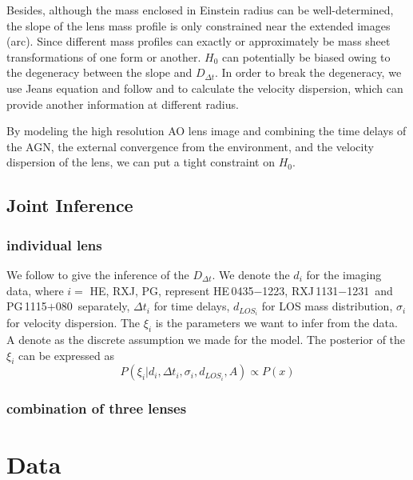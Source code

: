 \documentclass[fleqn,usenatbib]{mnras}
\newcommand\rxj{RXJ\,1131$-$1231}
\newcommand\he{HE\,0435$-$1223}
\newcommand\pg{PG\,1115$+$080}
\def\dt{D_{\Delta t}}
\begin{document}
Besides, although the mass enclosed in Einstein radius can be well-determined, the slope of the lens mass profile is only constrained near the extended images (arc). Since different mass profiles can exactly or approximately be mass sheet transformations of one form or another. $H_{0}$ can potentially be biased owing to the degeneracy between the slope and $D_{\Delta t}$. In order to break the degeneracy, we use Jeans equation \citep{Jeans1915J} and follow \citet{BinneyTremaine87} and \citet{SuyuEtal10,SuyuEtal13} to calculate the velocity dispersion, which can provide another information at different radius. 


By modeling the high resolution AO lens image and combining the time delays of the AGN, the external convergence from the environment, and the velocity dispersion of the lens, we can put a tight constraint on $H_{0}$. 


\subsection{Joint Inference}
\label{sec:Jointinfer}


\subsubsection{individual lens}
We follow \citet{WongEtal16} to give the inference of the $\dt$. We denote the $d_{i}$ for the imaging data, where $i=$ HE, RXJ, PG, represent \he, \rxj\, and \pg\ separately, $\Delta t_{i}$ for time delays, $d_{LOS_{i}}$ for LOS mass distribution, $\sigma_{i}$ for velocity dispersion. The $\xi_{i}$ is the parameters we want to infer from the data. A denote as the discrete assumption we made for the model.
The posterior of the $\xi_{i}$ can be expressed as
\begin{equation}
P(\xi_{i}|d_{i},\Delta t_{i},\sigma_{i}, d_{LOS_{i}}, A)\propto P(x)
\end{equation}


\subsubsection{combination of three lenses}


\section{Data}
\end{document}
